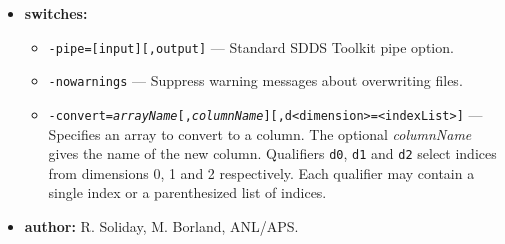 \begin{itemize}
\item {\bf switches:}
    \begin{itemize}
    \item {\tt -pipe=[input][,output]} --- Standard SDDS Toolkit pipe option.
    \item {\tt -nowarnings} --- Suppress warning messages about overwriting files.
    \item {\tt -convert={\em arrayName}[,{\em columnName}][,d<dimension>=<indexList>]} ---
          Specifies an array to convert to a column. The optional {\em columnName}
          gives the name of the new column. Qualifiers \verb|d0|, \verb|d1| and
          \verb|d2| select indices from dimensions 0, 1 and 2 respectively. Each
          qualifier may contain a single index or a parenthesized list of
          indices.
    \end{itemize}
\item {\bf author:} R. Soliday, M. Borland, ANL/APS.
\end{itemize}
